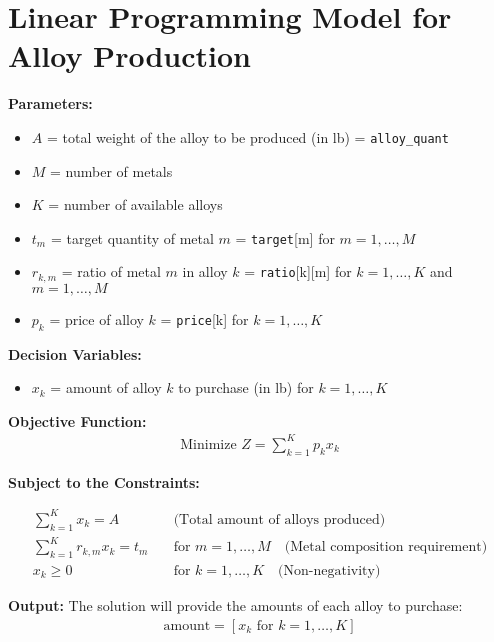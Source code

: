 \documentclass{article}
\begin{document}
\section*{Linear Programming Model for Alloy Production}

\textbf{Parameters:}
\begin{itemize}
	\item $A$ = total weight of the alloy to be produced (in lb) = \texttt{alloy\_quant}
	\item $M$ = number of metals
	\item $K$ = number of available alloys
	\item $t_m$ = target quantity of metal $m$ = \texttt{target}[m] for $m = 1, \ldots, M$
	\item $r_{k,m}$ = ratio of metal $m$ in alloy $k$ = \texttt{ratio}[k][m] for $k = 1, \ldots, K$ and $m = 1, \ldots, M$
	\item $p_k$ = price of alloy $k$ = \texttt{price}[k] for $k = 1, \ldots, K$
\end{itemize}

\textbf{Decision Variables:}
\begin{itemize}
	\item $x_k$ = amount of alloy $k$ to purchase (in lb) for $k = 1, \ldots, K$
\end{itemize}

\textbf{Objective Function:}
\begin{align*}
\text{Minimize } Z = \sum_{k=1}^{K} p_k x_k
\end{align*}

\textbf{Subject to the Constraints:}

\begin{align}
\sum_{k=1}^{K} x_k = A \quad & \text{(Total amount of alloys produced)} \tag{1} \\
\sum_{k=1}^{K} r_{k,m} x_k = t_m \quad & \text{for } m = 1, \ldots, M \quad \text{(Metal composition requirement)} \tag{2} \\
x_k \geq 0 \quad & \text{for } k = 1, \ldots, K \quad \text{(Non-negativity)} \tag{3}
\end{align}

\textbf{Output:}
The solution will provide the amounts of each alloy to purchase:
\begin{align*}
\text{amount} = [x_k \text{ for } k = 1, \ldots, K]
\end{align*}
\end{document}
